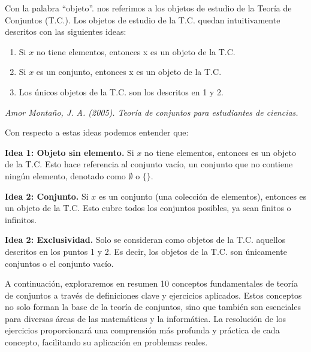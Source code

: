 \documentclass[11pt, a4paper]{article}
\begin{document}
  
  Con la palabra “objeto”. nos referimos a los objetos de estudio de la Teoría de Conjuntos (T.C.). Los objetos de estudio de la T.C. quedan intuitivamente descritos con las siguientes ideas:
  \begin{enumerate}
    \item Si $x$ no tiene elementos, entonces x es un objeto de la T.C.
    \item Si $x$ es un conjunto, entonces x es un objeto de la T.C.
    \item Los únicos objetos de la T.C. son los descritos en 1 y 2.
  \end{enumerate}
  \begin{flushright}
    \textit{Amor Montaño, J. A. (2005). Teoría de conjuntos para estudiantes de ciencias.}
\end{flushright}
Con respecto a estas ideas podemos entender que:

  \textbf{Idea 1: Objeto sin elemento. } Si $x$ no tiene elementos, entonces es un objeto de la T.C. Esto hace referencia al conjunto vacío, un conjunto que no contiene ningún elemento, denotado como $\emptyset$ o $\{\}$.

  \textbf{Idea 2: Conjunto. } Si $x$ es un conjunto (una colección de elementos), entonces es un objeto de la T.C. Esto cubre todos los conjuntos posibles, ya sean finitos o infinitos.

  \textbf{Idea 2: Exclusividad. } Solo se consideran como objetos de la T.C. aquellos descritos en los puntos 1 y 2. Es decir, los objetos de la T.C. son únicamente conjuntos o el conjunto vacío.

  A continuación, exploraremos en resumen 10 conceptos fundamentales de teoría de conjuntos a través de definiciones clave y ejercicios aplicados. Estos conceptos no solo forman la base de la teoría de conjuntos, sino que también son esenciales para diversas áreas de las matemáticas y la informática. La resolución de los ejercicios proporcionará una comprensión más profunda y práctica de cada concepto, facilitando su aplicación en problemas reales.

  \newpage
\end{document}
